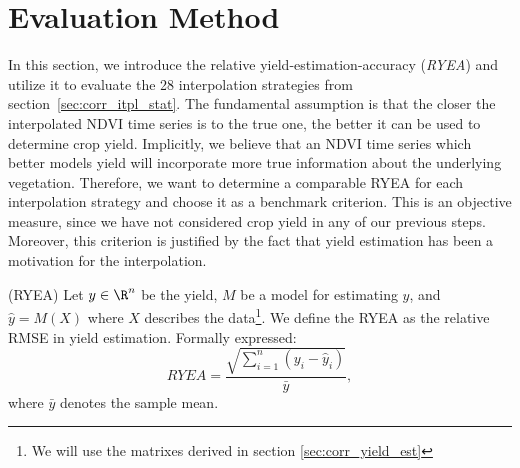\section{Evaluation Method}{
    \label{sec:ndvi_corr_eval}
    In this section, we introduce the relative yield-estimation-accuracy (\textit{RYEA}) and utilize it to evaluate the 28 interpolation strategies from section~\ref{sec:corr_itpl_stat}. 
    The fundamental assumption is that the closer the interpolated NDVI time series is to the true one, the better it can be used to determine crop yield. Implicitly, we believe that an NDVI time series which better models yield will incorporate more true information about the underlying vegetation. 
    Therefore, we want to determine a comparable RYEA for each interpolation strategy and choose it as a benchmark criterion. 
    This is an objective measure, since we have not considered crop yield in any of our previous steps. Moreover, this criterion is justified by the fact that yield estimation has been a motivation for the interpolation.

    \begin{definition}(RYEA) \label{def:ryea}
        Let $y\in \R^n$ be the yield, $M$ be a model for estimating $y$, and $\hat y = M(X)$ where $X$ describes the data\footnote{We will use the matrixes derived in section \ref{sec:corr_yield_est}}. 
        We define the RYEA as the relative RMSE in yield estimation. Formally expressed:
        \begin{equation}
            RYEA = \frac{\sqrt{\sum_{i=1}^n(y_i - \hat y_i)}}{\bar y}, %
        \end{equation}
        where $\bar y$ denotes the sample mean.
    \end{definition}

}
